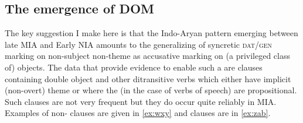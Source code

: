 \documentclass[output=paper,
modfonts
]{LSP/langsci}
\begin{document}
\subsection{The emergence of DOM} 
The key suggestion I make here is that the Indo-Aryan  pattern emerging between late MIA and Early NIA amounts to the generalizing  of  syncretic \textsc{dat/gen} marking on non-subject non-theme   as accusative marking on (a privileged class of) objects. The data that provide evidence to enable such a  are clauses containing  double object and other ditransitive verbs which either have implicit (non-overt) theme  or where the  (in the case of verbs of speech) are propositional. Such clauses are not very frequent but they do occur  quite reliably in MIA. Examples of non- clauses are given  in  \cref{ex:wxy} and  clauses are in \cref{ex:zab}. 
\end{document}
